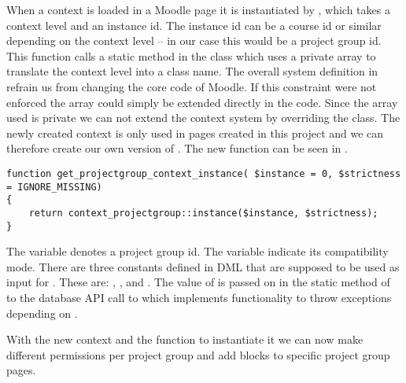 When a context is loaded in a Moodle page it is instantiated by , which takes a context level and an instance id. 
The instance id can be a course id or similar depending on the context level -- in our case this would be a project group id. 
This function calls a static method in the  class which uses a private array to translate the context level into a class name.
The overall system definition in  refrain us from changing the core code of Moodle. 
If this constraint were not enforced the array could simply be extended directly in the code.  
Since the array used is private we can not extend the context system by overriding the  class. 
The newly created context is only used in pages created in this project and we can therefore create our own version of . 
The new function can be seen in .
\begin{lstlisting}[style=phpCode, caption=\myCaption{The function to get projectgroup context}, label=src:codeprojectgroupcontextinstance]
function get_projectgroup_context_instance( $instance = 0, $strictness = IGNORE_MISSING) 
{ 
    return context_projectgroup::instance($instance, $strictness);
}
\end{lstlisting}

The  variable denotes a project group id.
The  variable indicate its compatibility mode.
There are three constants defined in \moodle{} DML that are supposed to be used as input for .
These are: , , and .
The value of  is passed on in the static method  of  to the \moodle{} database API call to  which implements functionality to throw exceptions depending on .

With the new context and the function to instantiate it we can now make different permissions per project group and add blocks to specific project group pages. 